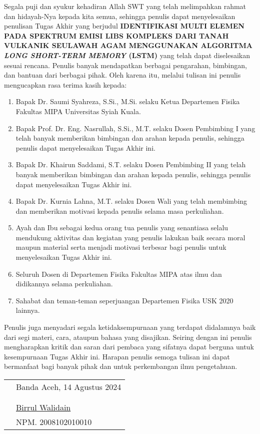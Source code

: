 \preface %


Segala puji dan syukur kehadiran Allah SWT yang telah melimpahkan rahmat dan hidayah-Nya kepada kita semua, sehingga penulis dapat menyelesaikan penulisan Tugas Akhir yang berjudul \textbf{{\MakeUppercase{Identifikasi Multi Elemen pada Spektrum Emisi LIBS Kompleks Dari Tanah Vulkanik Seulawah Agam Menggunakan Algoritma \textit{Long Short-Term Memory} (LSTM)}}} yang telah dapat diselesaikan sesuai rencana. Penulis banyak mendapatkan berbagai pengarahan, bimbingan, dan bantuan dari berbagai pihak. Oleh karena itu, melalui tulisan ini penulis mengucapkan rasa terima kasih kepada:

\begin{enumerate} 

	\item {Bapak Dr. Saumi Syahreza, S.Si., M.Si. selaku Ketua Departemen Fisika Fakultas MIPA Universitas Syiah Kuala.}

	\item{Bapak Prof. Dr. Eng. Nasrullah, S.Si., M.T.
 selaku Dosen Pembimbing I yang telah banyak memberikan bimbingan dan arahan kepada penulis, sehingga penulis dapat menyelesaikan Tugas Akhir ini.}
	\item{Bapak Dr. Khairun Saddami, S.T.
 selaku Dosen Pembimbing II yang telah banyak memberikan bimbingan dan arahan kepada penulis, sehingga penulis dapat menyelesaikan Tugas Akhir ini.}

	\item{Bapak Dr. Kurnia Lahna, M.T. selaku Dosen Wali yang telah membimbing
dan memberikan motivasi kepada penulis selama masa perkuliahan.}
  	\item{Ayah dan Ibu sebagai kedua orang tua penulis yang senantiasa selalu mendukung aktivitas dan kegiatan yang penulis lakukan baik secara moral maupun material serta menjadi motivasi terbesar bagi penulis untuk menyelesaikan Tugas Akhir ini.}
	\item{Seluruh Dosen di Departemen Fisika Fakultas MIPA atas ilmu dan didikannya selama perkuliahan.}
	\item{Sahabat dan teman-teman seperjuangan Departemen Fisika USK 2020 lainnya.}
\end{enumerate}


Penulis juga menyadari segala ketidaksempurnaan yang terdapat didalamnya baik dari segi materi, cara, ataupun bahasa yang disajikan. Seiring dengan ini penulis mengharapkan kritik dan saran dari pembaca yang sifatnya dapat berguna untuk kesempurnaan Tugas Akhir ini. Harapan penulis semoga tulisan ini dapat bermanfaat bagi banyak pihak dan untuk perkembangan ilmu pengetahuan.

\vspace{1cm}


\begin{tabular}{p{7.5cm}l}
	&Banda Aceh, 14 Agustus 2024\\
	&\\
	&\\
	&\multirow{1.5}{7.5cm}{\underline{Birrul Walidain}} \\ 
	&NPM. 2008102010010 \\
\end{tabular}

